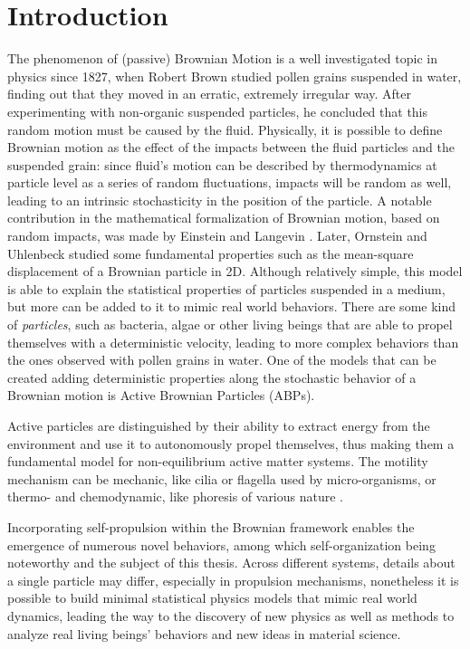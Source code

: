 \documentclass[../../master_thesis_np.tex]{subfiles}
\begin{document}
 
\chapter{Introduction}
	The phenomenon of (passive) Brownian Motion is a well investigated topic in physics since 1827, when Robert Brown studied pollen grains suspended in water, finding out that they moved in an erratic, extremely irregular way.
	After experimenting with non-organic suspended particles, he concluded that this random motion must be caused by the fluid.
	Physically, it is possible to define Brownian motion as the effect of the impacts between the fluid particles and the suspended grain: since fluid's motion can be described by thermodynamics at particle level as a series of random fluctuations, impacts will be random as well, leading to an intrinsic stochasticity in the position of the particle.
	A notable contribution in the mathematical formalization of Brownian motion, based on random impacts, was made by Einstein and Langevin \cite{gardiner_handbook_2004}. 
	Later, Ornstein and Uhlenbeck \cite{uhlenbeck_theory_1930} studied some fundamental properties such as the mean-square displacement of a Brownian particle in 2D.
	Although relatively simple, this model is able to explain the statistical properties of particles suspended in a medium, but more can be added to it to mimic real world behaviors. 
	There are some kind of \emph{particles}, such as bacteria, algae or other living beings that are able to propel themselves with a deterministic velocity, leading to more complex behaviors than the ones observed with pollen grains in water. 
	One of the models that can be created adding deterministic properties along the stochastic behavior of a Brownian motion is Active Brownian Particles (ABPs).
	
	Active particles are distinguished by their ability to extract energy from the environment and use it to autonomously propel themselves, thus making them a fundamental model for non-equilibrium active matter systems.	
	The motility mechanism can be mechanic, like cilia or flagella used by micro-organisms, or thermo- and chemodynamic, like phoresis of various nature \citeauthor{moran_phoretic_2017}.
	
	Incorporating self-propulsion within the Brownian framework enables the emergence of numerous novel behaviors, among which self-organization being noteworthy and the subject of this thesis. 
	Across different systems, details about a single particle may differ, especially in propulsion mechanisms, nonetheless it is possible to build minimal statistical physics models that mimic real world dynamics, leading the way to the discovery of new physics as well as methods to analyze real living beings' behaviors and new ideas in material science. 
	
\end{document}
